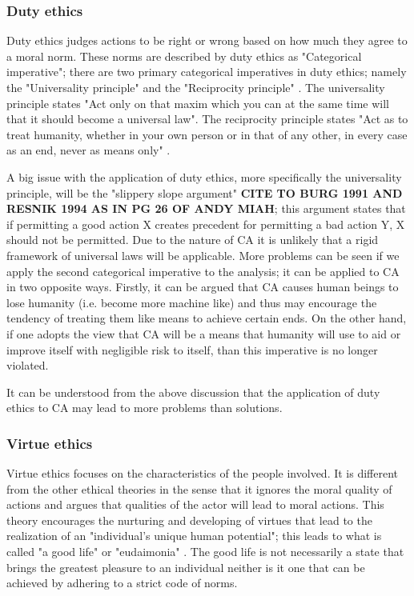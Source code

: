 
\subsubsection{Duty ethics}

Duty ethics judges actions to be right or wrong based on how much they agree to a moral norm. These norms are described by duty ethics as "Categorical imperative"; there are two primary categorical imperatives in duty ethics; namely the "Universality principle" and the "Reciprocity principle" \cite[ch. 3.8]{Ethics_textbook}. The universality principle states "Act only on that maxim which you can at the same time will that it should become a universal law". The reciprocity principle states "Act as to treat humanity, whether in your own person or in that of any other, in every case as an end, never as means only" \cite[ch. 3.8]{Ethics_textbook}.

A big issue with the application of duty ethics, more specifically the universality principle, will be the "slippery slope argument" {\bf CITE TO BURG 1991 AND RESNIK 1994 AS IN PG 26 OF ANDY MIAH}; this argument states that if permitting a good action X creates precedent for permitting a bad action Y, X should not be permitted. Due to the nature of CA it is unlikely that a rigid framework of universal laws will be applicable. More problems can be seen if we apply the second categorical imperative to the analysis; it can be applied to CA in two opposite ways. Firstly, it can be argued that CA causes human beings to lose humanity (i.e. become more machine like) and thus may encourage the tendency of treating them like means to achieve certain ends. On the other hand, if one adopts the view that CA will be a means that humanity will use to aid or improve itself with negligible risk to itself, than this imperative is no longer violated.

It can be understood from the above discussion that the application of duty ethics to CA may lead to more problems than solutions.

\subsubsection{Virtue ethics}

Virtue ethics focuses on the characteristics of the people involved. It is different from the other ethical theories in the sense that it ignores the moral quality of actions and argues that qualities of the actor will lead to moral actions. This theory encourages the nurturing and developing of virtues that lead to the realization of an "individual's unique human potential"; this leads to what is called "a good life" or "eudaimonia" \cite[ch. 3.9]{Ethics_textbook}. The good life is not necessarily a state that brings the greatest pleasure to an individual neither is it one that can be achieved by adhering to a strict code of norms.

